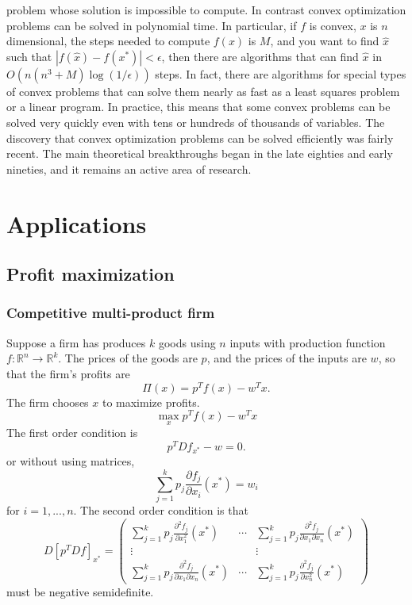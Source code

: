 \documentclass[12pt,reqno]{amsart}
\theoremstyle{definition}
\def\R{\mathbb{R}}
\newcommand{\abs}[1]{\left\vert {#1} \right\vert}
\renewcommand{\to}{{\rightarrow}}
\begin{document}
problem whose solution is impossible to compute. In contrast convex
optimization problems can be solved in polynomial time. In particular,
if $f$ is convex, $x$ is $n$ dimensional, the steps needed to compute
$f(x)$ is $M$, and you want to find $\hat{x}$ such that
$\abs{f(\hat{x}) - f(x^\ast)} < \epsilon$, then there are algorithms
that can find $\hat{x}$ in $O\left(n(n^3+M)\log(1/\epsilon)\right)$
steps. In fact, there are algorithms for special types of convex
problems that can solve them nearly as fast as a least squares problem
or a linear program. In practice, this means that some convex problems
can be solved very quickly even with tens or hundreds of thousands of
variables. The discovery that convex optimization problems can be
solved efficiently was fairly recent. The main theoretical
breakthroughs began in the late eighties and early nineties, and it
remains an active area of research.

\section{Applications}

\subsection{Profit maximization}

\subsubsection{Competitive multi-product firm}
Suppose a firm has produces $k$ goods using $n$ inputs with production
function $f: \R^n \to \R^k$. The prices of the goods are $p$, and the
prices of the inputs are $w$, so that the firm's profits are 
\[ \Pi(x) =  p^T f(x) -  w^Tx. \]
The firm chooses $x$ to maximize profits.
\[ \max_x p^T f(x) - w^T x \]
The first order condition is
\[ p^T Df_{x^*} - w = 0. \]
or without using matrices,
\[ \sum_{j=1}^k p_j \frac{\partial f_j}{\partial x_i}(x^*) = w_i \]
for $i=1,..., n$. The second order condition is that 
\[ D[p^T Df]_{x^*} = \begin{pmatrix} \sum_{j=1}^k p_j \frac{\partial^2
    f_j}{\partial x_1^2}(x^*) & \cdots & \sum_{j=1}^k p_j \frac{\partial^2
    f_j}{\partial x_1\partial x_n}(x^*)  \\ \vdots & & \vdots \\
  \sum_{j=1}^k p_j \frac{\partial^2
    f_j}{\partial x_1\partial x_n}(x^*) & \cdots & \sum_{j=1}^k p_j
  \frac{\partial^2 f_j}{\partial x_n^2}(x^*) \end{pmatrix} 
\]
must be negative semidefinite. 
\end{document}
